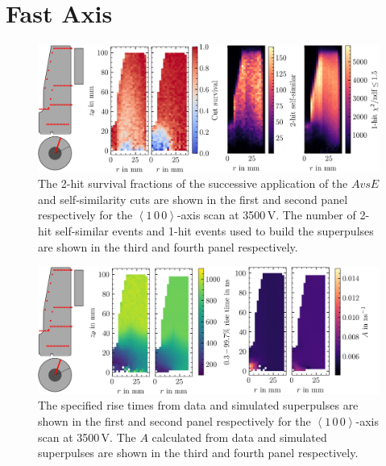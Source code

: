 \section{Fast Axis}
\begin{figure}[H]
    \centering
    \includegraphics[width=6in]{figs/library/fast_axis_nhits.png}
    \caption{The 2-hit survival fractions of the successive application of the $AvsE$ and self-similarity cuts are shown in the first and second panel respectively for the $\left<1\,0\,0\right>$-axis scan at 3500\,V. The number of 2-hit self-similar events and 1-hit events used to build the superpulses are shown in the third and fourth panel respectively.}
	\label{fig:fast_axis_nhits}
\end{figure}
\begin{figure}[H]
    \centering
    \includegraphics[width=6in]{figs/library/fast_axis_dt_aoe.png}
    \caption{The specified rise times from data and simulated superpulses are shown in the first and second panel respectively for the $\left<1\,0\,0\right>$-axis scan at 3500\,V. The $A$ calculated from data and simulated superpulses are shown in the third and fourth panel respectively.}
	\label{fig:dt_aoe_fast_axis}
\end{figure}

